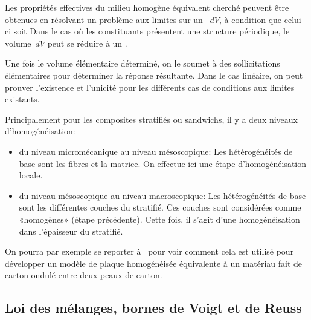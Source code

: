\medskip
Les propriétés effectives du milieu homogène équivalent cherché peuvent être obtenues en résolvant un problème aux limites sur un ~$dV$, à condition que celui-ci soit  Dans le cas où les constituants présentent une structure périodique, le volume~$dV$ peut se réduire à un .

\medskip
Une fois le volume élémentaire déterminé, on le soumet à des sollicitations élémentaires pour déterminer la réponse résultante. 
Dans le cas linéaire, on peut prouver l'existence et l'unicité pour les différents cas de conditions aux limites existants.

\medskip
Principalement pour les composites stratifiés ou sandwichs, il y a deux niveaux d'homogénéisation:
\begin{itemize}
	\item du niveau micromécanique au niveau mésoscopique:
		Les hétérogénéités de base sont les fibres et la matrice. On effectue ici
		 une étape d'homogénéisation locale.
	\item du niveau mésoscopique au niveau macroscopique:
		Les hétérogénéités de base sont les différentes couches du stratifié.
		 Ces couches sont considérées comme «homogènes» (étape précédente).
		 Cette fois, il s'agit d'une homogénéisation dans l'épaisseur du stratifié.
\end{itemize}

\medskip
On pourra par exemple se reporter à~\cite{bib-Corrugated} pour voir comment cela est utilisé pour développer un modèle de plaque homogénéisée équivalente à un matériau fait de carton ondulé entre deux peaux de carton.

\medskip
\subsection{Loi des mélanges, bornes de Voigt et de Reuss}

